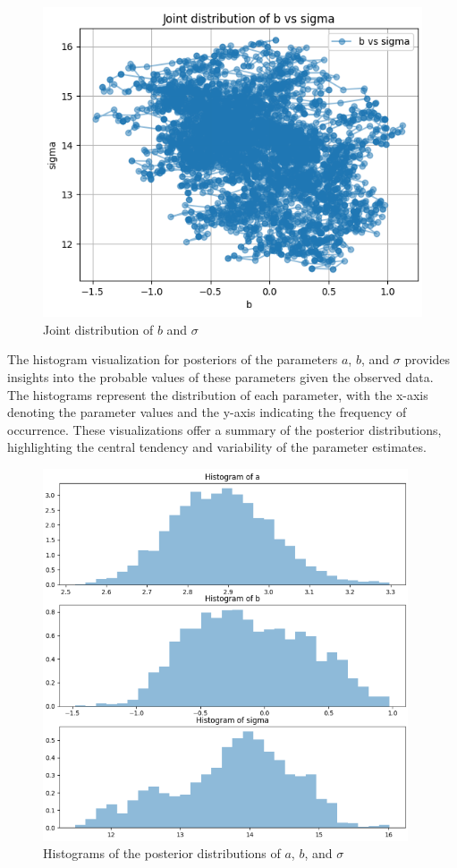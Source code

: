 \begin{figure}[htbp]
    \centering
    \includegraphics[width=\linewidth]{plots/output_multivar_6.png}
    \caption{Joint distribution of \(b\) and \(\sigma\)}
    \label{fig:my_label}
\end{figure}

The histogram visualization for posteriors of the parameters \( a \), \( b \), and \( \sigma \) provides insights into the probable values of these parameters given the observed data. The histograms represent the distribution of each parameter, with the x-axis denoting the parameter values and the y-axis indicating the frequency of occurrence. These visualizations offer a summary of the posterior distributions, highlighting the central tendency and variability of the parameter estimates.

\begin{figure}[htbp]
    \centering
    \includegraphics[width=\linewidth, height= 11cm]{plots/output_multivar_7.png}
    \caption{Histograms of the posterior distributions of \(a\), \(b\), and \(\sigma\)}
    \label{fig:my_label}
\end{figure}

